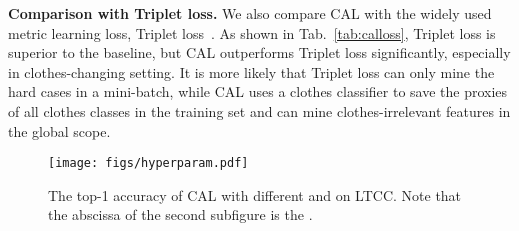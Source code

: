 \documentclass[10pt,twocolumn,letterpaper]{article}
\begin{document}
\medskip
\noindent
\textbf{Comparison with Triplet loss.}
We also compare CAL with the widely used metric learning loss, \ie Triplet loss~\cite{Hermans2017In}.
As shown in Tab.~\ref{tab:calloss}, Triplet loss is superior to the baseline, but CAL outperforms Triplet loss significantly, especially in clothes-changing setting.
It is more likely that Triplet loss can only mine the hard cases in a mini-batch, while CAL uses a clothes classifier to save the proxies of all clothes classes in the training set and can mine clothes-irrelevant features in the global scope.



\begin{table}[t]
	\centering
	\caption{Comparison on standard datasets without clothes-changing.}
	\vspace{-20pt}
	\small
	\begin{center}
	\end{center}
	\vspace{-15pt}
	\label{tab:standard_dataset}
\end{table}

\begin{figure} [t]
	\centering
	\texttt{[image: figs/hyperparam.pdf]}
	\vspace{-15pt}
	\caption{The top-1 accuracy of CAL with different  and  on LTCC. Note that the abscissa of the second subfigure is the .}
	\label{fig:hyperparam} 
	\vspace{-15pt}
\end{figure}
\end{document}
